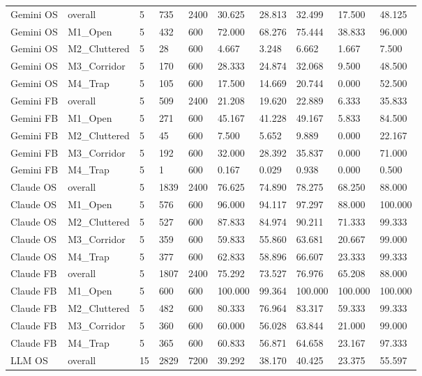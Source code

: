 \begin{tabular}{llllllllll}
Gemini OS & overall & 5 & 735 & 2400 & 30.625 & 28.813 & 32.499 & 17.500 & 48.125 \\
Gemini OS & M1\_Open & 5 & 432 & 600 & 72.000 & 68.276 & 75.444 & 38.833 & 96.000 \\
Gemini OS & M2\_Cluttered & 5 & 28 & 600 & 4.667 & 3.248 & 6.662 & 1.667 & 7.500 \\
Gemini OS & M3\_Corridor & 5 & 170 & 600 & 28.333 & 24.874 & 32.068 & 9.500 & 48.500 \\
Gemini OS & M4\_Trap & 5 & 105 & 600 & 17.500 & 14.669 & 20.744 & 0.000 & 52.500 \\
Gemini FB & overall & 5 & 509 & 2400 & 21.208 & 19.620 & 22.889 & 6.333 & 35.833 \\
Gemini FB & M1\_Open & 5 & 271 & 600 & 45.167 & 41.228 & 49.167 & 5.833 & 84.500 \\
Gemini FB & M2\_Cluttered & 5 & 45 & 600 & 7.500 & 5.652 & 9.889 & 0.000 & 22.167 \\
Gemini FB & M3\_Corridor & 5 & 192 & 600 & 32.000 & 28.392 & 35.837 & 0.000 & 71.000 \\
Gemini FB & M4\_Trap & 5 & 1 & 600 & 0.167 & 0.029 & 0.938 & 0.000 & 0.500 \\
Claude OS & overall & 5 & 1839 & 2400 & 76.625 & 74.890 & 78.275 & 68.250 & 88.000 \\
Claude OS & M1\_Open & 5 & 576 & 600 & 96.000 & 94.117 & 97.297 & 88.000 & 100.000 \\
Claude OS & M2\_Cluttered & 5 & 527 & 600 & 87.833 & 84.974 & 90.211 & 71.333 & 99.333 \\
Claude OS & M3\_Corridor & 5 & 359 & 600 & 59.833 & 55.860 & 63.681 & 20.667 & 99.000 \\
Claude OS & M4\_Trap & 5 & 377 & 600 & 62.833 & 58.896 & 66.607 & 23.333 & 99.333 \\
Claude FB & overall & 5 & 1807 & 2400 & 75.292 & 73.527 & 76.976 & 65.208 & 88.000 \\
Claude FB & M1\_Open & 5 & 600 & 600 & 100.000 & 99.364 & 100.000 & 100.000 & 100.000 \\
Claude FB & M2\_Cluttered & 5 & 482 & 600 & 80.333 & 76.964 & 83.317 & 59.333 & 99.333 \\
Claude FB & M3\_Corridor & 5 & 360 & 600 & 60.000 & 56.028 & 63.844 & 21.000 & 99.000 \\
Claude FB & M4\_Trap & 5 & 365 & 600 & 60.833 & 56.871 & 64.658 & 23.167 & 97.333 \\
LLM OS & overall & 15 & 2829 & 7200 & 39.292 & 38.170 & 40.425 & 23.375 & 55.597 \\

\end{tabular}
